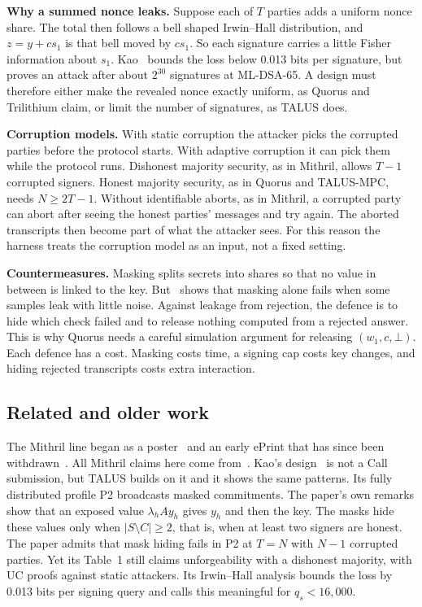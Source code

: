 \documentclass[10pt,conference,a4paper]{IEEEtran}
\begin{document}
\textbf{Why a summed nonce leaks.} Suppose each of $T$ parties adds a uniform nonce share. The total then follows a bell
shaped Irwin--Hall distribution, and $z=y+cs_1$ is that bell moved by $cs_1$. So each signature carries a little Fisher
information about $s_1$. Kao~\cite{kao} bounds the loss below 0.013 bits per signature, but~\cite{talus} proves an attack
after about $2^{30}$ signatures at ML-DSA-65. A design must therefore either make the revealed nonce exactly uniform, as
Quorus and Trilithium claim, or limit the number of signatures, as TALUS does.

\textbf{Corruption models.} With static corruption the attacker picks the corrupted parties before the protocol starts.
With adaptive corruption it can pick them while the protocol runs. Dishonest majority security, as in Mithril, allows
$T-1$ corrupted signers. Honest majority security, as in Quorus and TALUS-MPC, needs $N\ge2T-1$. Without identifiable
aborts, as in Mithril, a corrupted party can abort after seeing the honest parties' messages and try again. The aborted
transcripts then become part of what the attacker sees. For this reason the harness treats the corruption model as an
input, not a fixed setting.

\textbf{Countermeasures.} Masking splits secrets into shares so that no value in between is linked to the key.
But~\cite{concealed} shows that masking alone fails when some samples leak with little noise. Against leakage from
rejection, the defence is to hide which check failed and to release nothing computed from a rejected answer. This is why
Quorus needs a careful simulation argument for releasing $(w_1,c,\bot)$. Each defence has a cost. Masking costs time, a
signing cap costs key changes, and hiding rejected transcripts costs extra interaction.

\subsection{Related and older work}
The Mithril line began as a poster~\cite{mithrilposter} and an early ePrint that has since been
withdrawn~\cite{reloaded}. All Mithril claims here come from~\cite{mithril,mithrilpw}. Kao's design~\cite{kao} is not a
Call submission, but TALUS builds on it and it shows the same patterns. Its fully distributed profile P2 broadcasts masked
commitments. The paper's own remarks show that an exposed value $\lambda_hAy_h$ gives $y_h$ and then the key. The masks
hide these values only when $|S\setminus C|\ge2$, that is, when at least two signers are honest. The paper admits that mask
hiding fails in P2 at $T=N$ with $N-1$ corrupted parties. Yet its Table~1 still claims unforgeability with a dishonest
majority, with UC proofs against static attackers. Its Irwin--Hall analysis bounds the loss by 0.013 bits per signing
query and calls this meaningful for $q_s<16{,}000$.
\end{document}
